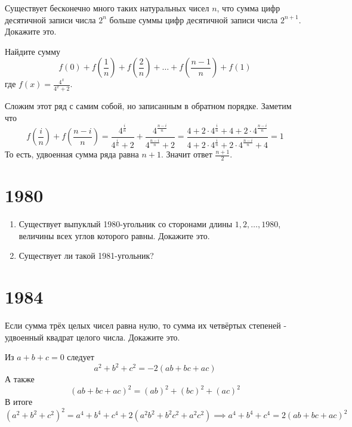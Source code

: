 \documentclass[11pt, a4paper]{problems_template}
\begin{document}
\begin{exercise}[390]
Существует бесконечно много таких натуральных чисел $n$, что сумма цифр десятичной записи числа $2^{n}$ больше суммы цифр десятичной записи числа $2^{n+1}$. Докажите это.
\end{exercise}

\begin{exercise}[393]
Найдите сумму
$$
f(0) + f\left(\frac{1}{n}\right) + f\left(\frac{2}{n}\right) + \dots + f\left(\frac{n-1}{n}\right)+ f(1) 
$$
где $f(x) = \frac{4^{x}}{4^{x}+2}$.
\end{exercise}

\begin{Solution}
Сложим этот ряд с самим собой, но записанным в обратном порядке. Заметим что
$$
f\left(\frac{i}{n}\right) + f\left(\frac{n-i}{n}\right) = \frac{4^{\frac{i}{n}}}{4^{\frac{i}{n}}+2} + \frac{4^{\frac{n-i}{n}}}{4^{\frac{n-i}{n}}+2} = \frac{4 + 2 \cdot 4^{\frac{i}{n}} + 4 + 2 \cdot 4^{\frac{n-i}{n}}}{4 + 2 \cdot 4^{\frac{i}{n}} + 2 \cdot 4^{\frac{n-i}{n}} + 4} = 1
$$
То есть, удвоенная сумма ряда равна $n + 1$. Значит ответ $\frac{n+1}{2}$.
\end{Solution}


\chapter{1980}

\begin{exercise}[644]
\begin{enumerate}
\item Существует выпуклый 1980-угольник со сторонами длины $1, 2, \dots, 1980$,
величины всех углов которого равны. Докажите это.
\item Существует ли такой 1981-угольник?
\end{enumerate}
\end{exercise}

\chapter{1984}

\begin{exercise}[882]
Если сумма трёх целых чисел равна нулю, то сумма их четвёртых степеней - удвоенный квадрат целого числа. Докажите это.
\end{exercise}

\begin{Solution}
Из $a + b + c = 0$ следует
$$
a^{2} + b^{2} + c^{2} = -2(ab + bc + ac) 
$$
А также
$$
(ab + bc + ac)^{2} = (ab)^{2} + (bc)^{2} + (ac)^{2}
$$
В итоге
$$
(a^{2} + b^{2} + c^{2})^{2} = a^{4} + b^{4} + c^{4} + 2(a^{2}b^{2} + b^{2}c^{2} + a^{2}c^{2}) \implies a^{4} + b^{4} + c^{4} = 2(ab + bc + ac)^{2}
$$
\end{Solution}
\end{document}
